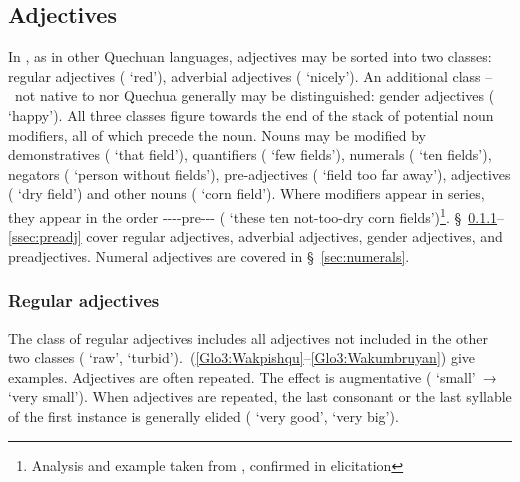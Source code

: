 {\subsection{Adjectives}
In \SYQ, as in other Quechuan languages, adjectives may be sorted into two classes: regular adjectives ( ‘red’), adverbial adjectives ( ‘nicely’). An additional class --~not native to \SYQ{} nor Quechua generally may be distinguished: gender adjectives ( ‘happy’). All three classes figure towards the end of the stack of potential noun modifiers, all of which precede the noun. Nouns may be modified by demonstratives (  ‘that field’), quantifiers (  ‘few fields’), numerals (  ‘ten fields’), negators (  ‘person without fields’), pre-adjectives (   ‘field too far away’), adjectives (  ‘dry field’) and other nouns (  ‘corn field’). Where modifiers appear in series, they appear in the order ----pre--- (       ‘these ten not-too-dry corn fields’)\footnote{Analysis and example taken from \citet{Parker76gram}, confirmed in elicitation}. §~\ref{ssec:regadj}--\ref{ssec:preadj} cover regular adjectives, adverbial adjectives, gender adjectives, and preadjectives. Numeral adjectives are covered in §~\ref{sec:numerals}.

\subsubsection{Regular adjectives}\label{ssec:regadj}
The class of regular adjectives includes all adjectives not included in the other two classes ( ‘raw’,  ‘turbid’).~(\ref{Glo3:Wakpishqu}--\ref{Glo3:Wakumbruyan}) give examples. Adjectives are often repeated. The effect is augmentative ( ‘small’~→~ ‘very small’). When adjectives are repeated, the last consonant or the last syllable of the first instance is generally elided ( ‘very good’,  ‘very big’).\\

}

